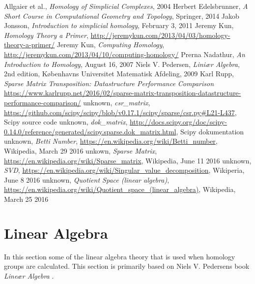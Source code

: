 \documentclass[11pt,a4paper,twoside, openright]{report}
\begin{document}
\begin{thebibliography}{9}

 Allgaier et al., \emph{Homology of Simplicial Complexes}, 2004
Herbert Edelsbrunner, \emph{A Short Course in Computational Geometry and Topology}, Springer, 2014
 Jakob Jonsson, \emph{Introduction to simplicial homology}, February 3, 2011
 Jeremy Kun, \emph{Homology Theory a Primer}, \url{http://jeremykun.com/2013/04/03/homology-theory-a-primer/}
 Jeremy Kun, \emph{Computing Homology}, \url{http://jeremykun.com/2013/04/10/computing-homology/}
 Prerna Nadathur, \emph{An Introduction to Homology}, August 16, 2007
 Niels V. Pedersen, \emph{Liniær Algebra}, 2nd edition, Københavns Universitet Matematisk Afdeling, 2009
 Karl Rupp, \emph{Sparse Matrix Transposition: Datastructure Performance Comparison} \url{https://www.karlrupp.net/2016/02/sparse-matrix-transposition-datastructure-performance-comparison/}
 unknown, \emph{csr\_matrix}, \url{https://github.com/scipy/scipy/blob/v0.17.1/scipy/sparse/csr.py#L21-L437}, Scipy source code
 unknown, \emph{dok\_matrix}, \url{http://docs.scipy.org/doc/scipy-0.14.0/reference/generated/scipy.sparse.dok_matrix.html}, Scipy dokumentation
 unknown, \emph{Betti Number}, \url{https://en.wikipedia.org/wiki/Betti_number}, Wikipedia, March 29 2016
 unkown, \emph{Sparse Matrix}, \url{https://en.wikipedia.org/wiki/Sparse_matrix}, Wikipedia, June 11 2016
 unknown, \emph{SVD}, \url{https://en.wikipedia.org/wiki/Singular_value_decomposition}, Wikiperia, June 8 2016
 unknown, \emph{Quotient Space (linear algebra)}, \url{https://en.wikipedia.org/wiki/Quotient_space_(linear_algebra)}, Wikipedia, March 25 2016
\end{thebibliography}

\appendix
\chapter{Linear Algebra}\label{ch:linalg}
In this section some of the linear algebra theory that is used when homology groups are calculated. This section is primarily based on Niels V. Pedersens book \emph{Lineær Algebra} \cite{LinAlg}.
\end{document}
